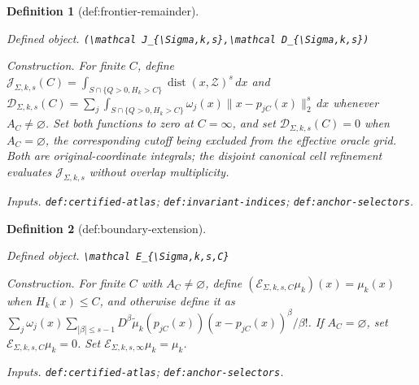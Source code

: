 \documentclass{article}
\newtheorem{definition}{Definition}
\begin{document}
\begin{definition}[def:frontier-remainder]\label{def:frontier-remainder}
\par\smallskip\noindent\emph{Defined object.} \texttt{(\textbackslash{}\allowbreak{}mathcal J\_\allowbreak{}\{\textbackslash{}\allowbreak{}Sigma,\allowbreak{}k,\allowbreak{}s\}\allowbreak{},\allowbreak{}\textbackslash{}\allowbreak{}mathcal D\_\allowbreak{}\{\textbackslash{}\allowbreak{}Sigma,\allowbreak{}k,\allowbreak{}s\}\allowbreak{})}
\par\smallskip\noindent\emph{Construction.} For finite \(C\), define \(\mathcal J_{\Sigma,k,s}(C)=\int_{S\cap\{Q>0,H_k>C\}}\operatorname{dist}(x,\mathcal Z)^s\,dx\) and \(\mathcal D_{\Sigma,k,s}(C)=\sum_j\int_{S\cap\{Q>0,H_k>C\}}\omega_j(x)\|x-p_{jC}(x)\|_2^s\,dx\) whenever \(A_C\ne\varnothing\). Set both functions to zero at \(C=\infty\), and set \(\mathcal D_{\Sigma,k,s}(C)=0\) when \(A_C=\varnothing\), the corresponding cutoff being excluded from the effective oracle grid. Both are original-coordinate integrals; the disjoint canonical cell refinement evaluates \(\mathcal J_{\Sigma,k,s}\) without overlap multiplicity.
\par\smallskip\noindent\emph{Inputs.} \texttt{def:\allowbreak{}certified-\allowbreak{}atlas}; \texttt{def:\allowbreak{}invariant-\allowbreak{}indices}; \texttt{def:\allowbreak{}anchor-\allowbreak{}selectors}.
\end{definition}

\begin{definition}[def:boundary-extension]\label{def:boundary-extension}
\par\smallskip\noindent\emph{Defined object.} \texttt{\textbackslash{}\allowbreak{}mathcal E\_\allowbreak{}\{\textbackslash{}\allowbreak{}Sigma,\allowbreak{}k,\allowbreak{}s,\allowbreak{}C\}\allowbreak{}}
\par\smallskip\noindent\emph{Construction.} For finite \(C\) with \(A_C\ne\varnothing\), define \((\mathcal E_{\Sigma,k,s,C}\mu_k)(x)=\mu_k(x)\) when \(H_k(x)\le C\), and otherwise define it as \(\sum_j\omega_j(x)\sum_{|\beta|\le s-1}D^\beta\widetilde\mu_k(p_{jC}(x))(x-p_{jC}(x))^\beta/\beta!\). If \(A_C=\varnothing\), set \(\mathcal E_{\Sigma,k,s,C}\mu_k=0\). Set \(\mathcal E_{\Sigma,k,s,\infty}\mu_k=\mu_k\).
\par\smallskip\noindent\emph{Inputs.} \texttt{def:\allowbreak{}certified-\allowbreak{}atlas}; \texttt{def:\allowbreak{}anchor-\allowbreak{}selectors}.
\end{definition}
\end{document}
